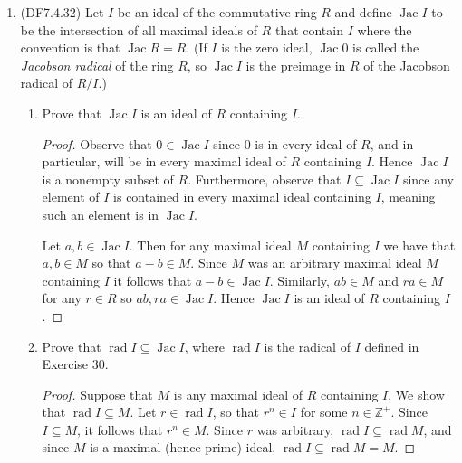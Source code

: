\documentclass[11pt]{article}
\DeclareMathOperator{\Jac}{Jac}
\DeclareMathOperator{\rad}{rad}
\begin{document}
\begin{enumerate}
\begin{proof}
    Let $P$ be a prime ideal of $R$, and we show that $\rad P = P$. We already know that $P\subseteq \rad P$, so it is sufficient to show the reverse inclusion. Suppose $p\in \rad P$, so that $p^n\in P$ for some $n\in \mathbb{Z}^+$. Then $p^n = pp^{n-1}\in P$, so that either $p$ or $p^{n-1}$ is in $P$ since $P$ is a prime ideal. If $p\in P$ then we are done. If not, then repeat the process with $p^{n-1}$ in place of $p^n$ and keep repeating until eventually we find that $p\in P$ since $n$ is finite. Since $p\in \rad P$ was arbitrary, it follows that $\rad P\subseteq P$ and so $\rad P = P$ for a prime ideal $P$ of $R$. 
    \end{proof}
    \item (DF7.4.32) Let $I$ be an ideal of the commutative ring $R$ and define $\Jac I$ to be the intersection of all maximal ideals of $R$ that contain $I$ where the convention is that $\Jac R = R$. (If $I$ is the zero ideal, $\Jac 0$ is called the \textit{Jacobson radical} of the ring $R$, so $\Jac I$ is the preimage in $R$ of the Jacobson radical of $R/I$.)\begin{enumerate}
      \item Prove that $\Jac I$ is an ideal of $R$ containing $I$. \begin{proof}
        Observe that $0\in \Jac I$ since $0$ is in every ideal of $R$, and in particular, will be in every maximal ideal of $R$ containing $I$. Hence $\Jac I$ is a nonempty subset of $R$. Furthermore, observe that $I\subseteq \Jac I$ since any element of $I$ is contained in every maximal ideal containing $I$, meaning such an element is in $\Jac I$.

        Let $a,b\in \Jac I$. Then for any maximal ideal $M$ containing $I$ we have that $a,b\in M$ so that $a-b\in M$. Since $M$ was an arbitrary maximal ideal $M$ containing $I$ it follows that $a-b\in \Jac I$. Similarly, $ab\in M$ and $ra\in M$ for any $r\in R$ so $ab, ra\in \Jac I$. Hence $\Jac I$ is an ideal of $R$ containing $I$.   
      \end{proof}
      \item Prove that $\rad I\subseteq \Jac I$, where $\rad I$ is the radical of $I$ defined in Exercise 30. \begin{proof}
        Suppose that $M$ is any maximal ideal of $R$ containing $I$. We show that $\rad I\subseteq M$. Let $r\in \rad I$, so that $r^n\in I$ for some $n\in \mathbb{Z}^+$. Since $I\subseteq M$, it follows that $r^n\in M$. Since $r$ was arbitrary, $\rad I\subseteq \rad M$, and since $M$ is a maximal (hence prime) ideal, $\rad I\subseteq \rad M = M$.
        

\end{proof}
\end{enumerate}
\end{enumerate}
\end{document}

